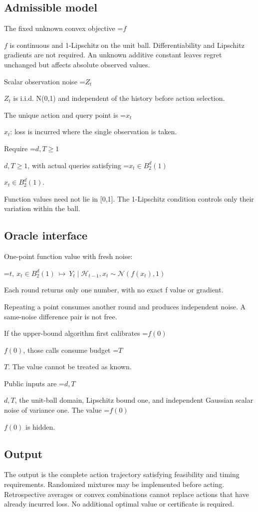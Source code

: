\documentclass[10pt,a4paper]{article}
\newcommand{\AtlasMath}[1]{\par\begingroup\centering\setbox0=\hbox{$\displaystyle #1$}\ifdim\wd0>1.4\linewidth\typeout{ATLAS WIDE FORMULA: \the\wd0}\fi\ifdim\wd0>\linewidth\resizebox{\linewidth}{!}{\box0}\else\box0\fi\par\endgroup}
\newcommand{\AtlasInlineMath}[1]{\begingroup\setbox0=\hbox{$#1$}\ifdim\wd0>.4\linewidth\endgroup\AtlasMath{#1}\else\endgroup$#1$\fi}
\begin{document}
\subsection{Admissible model}
The fixed unknown convex objective \AtlasInlineMath{f} is continuous and 1-Lipschitz on the unit ball. Differentiability and Lipschitz gradients are not required. An unknown additive constant leaves regret unchanged but affects absolute observed values.

Scalar observation noise \AtlasInlineMath{Z_t} is i.i.d. N(0,1) and independent of the history before action selection.

The unique action and query point is \AtlasInlineMath{x_t}: loss is incurred where the single observation is taken.

Require \AtlasInlineMath{d,T\ge1}, with actual queries satisfying \AtlasInlineMath{x_t\in B_2^d(1)}.

Function values need not lie in [0,1]. The 1-Lipschitz condition controls only their variation within the ball.

\subsection{Oracle interface}
One-point function value with fresh noise:


\AtlasMath{t,\ x_t\in B_2^d(1)\ \longmapsto\ Y_t\mid\mathcal{H}_{t-1},x_t\sim\mathcal{N}(f(x_t),1)}


Each round returns only one number, with no exact f value or gradient.

Repeating a point consumes another round and produces independent noise. A same-noise difference pair is not free.

If the upper-bound algorithm first calibrates \AtlasInlineMath{f(0)}, those calls consume budget \AtlasInlineMath{T}. The value cannot be treated as known.

Public inputs are \AtlasInlineMath{d,T}, the unit-ball domain, Lipschitz bound one, and independent Gaussian scalar noise of variance one. The value \AtlasInlineMath{f(0)} is hidden.

\subsection{Output}
The output is the complete action trajectory satisfying feasibility and timing requirements. Randomized mixtures may be implemented before acting. Retrospective averages or convex combinations cannot replace actions that have already incurred loss. No additional optimal value or certificate is required.
\end{document}
